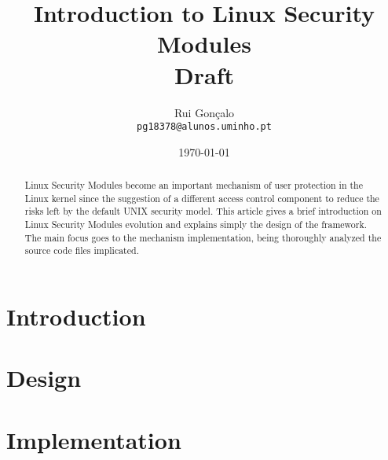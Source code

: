 \documentclass[]{article}
\begin{document}
\title{Introduction to Linux Security Modules\\ \small{Draft}}
\author{Rui Gonçalo
        \\{\scriptsize \texttt{pg18378@alunos.uminho.pt}}
       }
\date{\today}
\maketitle

\begin{abstract}
Linux Security Modules become an important mechanism of user protection in the Linux kernel since the suggestion of a different access control component to reduce the risks left by the default UNIX security model. This article gives a brief introduction on Linux Security Modules evolution and explains simply the design of the framework. The main focus goes to the mechanism implementation, being thoroughly analyzed the source code files implicated.
\end{abstract}


\section{Introduction}


\section{Design}


\section{Implementation}




\renewcommand{\bibname}{References}


\end{document}
